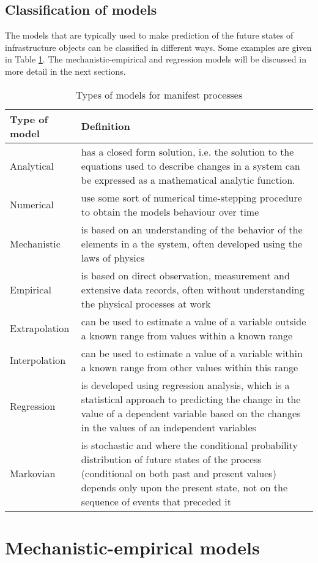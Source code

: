 \subsection{Classification of models}
The models that are typically used to make prediction of the future states of infrastructure objects can be classified in different ways. Some examples are given in Table \ref{tbl:31}. The mechanistic-empirical and regression models will be discussed in more detail in the next sections.
\begin{table}
\caption{Types of models for manifest processes}
\begin{tabular}{|l|p{300pt}|}
\hline
Type of model & Definition \\ 
\hline
Analytical & has a closed form solution, i.e. the solution to the equations used to describe changes in a system can be expressed as a mathematical analytic function. \\ 
\hline
Numerical & use some sort of numerical time-stepping procedure to obtain the models behaviour over time \\ 
\hline
Mechanistic & is based on an understanding of the behavior of the elements in a the system, often developed using the laws of physics \\ 
\hline
Empirical & is based on direct observation, measurement and extensive data records, often without understanding the physical processes at work \\ 
\hline
Extrapolation & can be used to estimate a value of a variable outside a known range from values within a known range \\ 
\hline
Interpolation & can be used to estimate a value of a variable within a known range from other values within this range \\ 
\hline
Regression & is developed using regression analysis, which is a statistical approach to predicting the change in the value of a dependent variable based on the changes in the values of an independent variables  \\ 
\hline
Markovian & is stochastic and where the conditional probability distribution of future states of the process (conditional on both past and present values) depends only upon the present state, not on the sequence of events that preceded it \\ 
\hline
\end{tabular}
\label{tbl:31}
\end{table}
\section{Mechanistic-empirical models}
